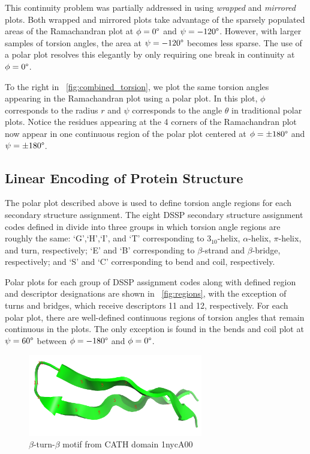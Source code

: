 \documentclass[letter,center,fleqn]{NAR}
\begin{document}
This continuity problem was partially addressed in \cite{Karplus2010} using \emph{wrapped} and \emph{mirrored} plots. 
Both wrapped and mirrored plots take advantage of the sparsely populated areas of the Ramachandran plot at $\phi = 0\degree$ and $\psi = -120\degree$.
However, with larger samples of torsion angles, the area at $\psi = -120\degree$ becomes less sparse. 
The use of a polar plot resolves this elegantly by only requiring one break in continuity at $\phi = 0\degree$. 

To the right in \figurename~\ref{fig:combined_torsion}, we plot the same torsion angles appearing in the Ramachandran plot using a polar plot. 
In this plot, $\phi$ corresponds to the radius $r$ and $\psi$ corresponds to the angle $\theta$ in traditional polar plots. 
Notice the residues appearing at the 4 corners of the Ramachandran plot now appear in one continuous region of the polar plot centered at $\phi = \pm180\degree$ and $\psi = \pm180\degree$. 

\subsection{Linear Encoding of Protein Structure}

The polar plot described above is used to define torsion angle regions for each secondary structure assignment. 
The eight DSSP secondary structure assignment codes defined in \cite{Kabsch1983} divide into three groups in which torsion angle regions are roughly the same: `G',`H',`I', and `T' corresponding to $3_{10}$-helix, $\alpha$-helix, $\pi$-helix, and turn, respectively; `E' and `B' corresponding to $\beta$-strand and $\beta$-bridge, respectively; and `S' and `C' corresponding to bend and coil, respectively.

Polar plots for each group of DSSP assignment codes along with defined region and descriptor designations are shown in \figurename~\ref{fig:regions}, with the exception of turns and bridges, which receive descriptors 11 and 12, respectively. 
For each polar plot, there are well-defined continuous regions of torsion angles that remain continuous in the plots. 
The only exception is found in the bends and coil plot at $\psi = 60\degree$ between $\phi = -180\degree$ and $\phi = 0\degree$.

\begin{figure}[b]
\begin{center}
\includegraphics[width=3in,keepaspectratio]{1nycA00}
\end{center}
\caption{$\beta$-turn-$\beta$ motif from CATH domain 1nycA00}
\label{fig:beta_turn}
\end{figure}
\end{document}
